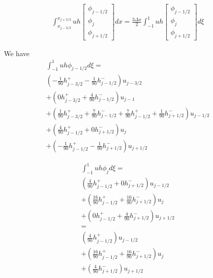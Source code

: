 \documentclass[12pt]{article}
\begin{document}
\begin{multline}
\int_{x_{j-3/2}}^{x_{j+3/2}} uh \left[\begin{array}{c}\phi_{j-1/2} \\\phi_{j}\\\phi_{j+1/2} \end{array}\right] dx = \frac{3 \Delta x}{2} \int_{-1}^{1} uh \left[\begin{array}{c}\phi_{j-1/2} \\\phi_{j}\\\phi_{j+1/2} \end{array}\right] d \xi
\end{multline}

We have
\begin{multline*}
\int_{-1}^{1} uh \phi_{j-1/2}d \xi = \\
\left(-\frac{1}{90}h^+ _{j - 3/2} - \frac{1}{90}h^- _{j - 1/2}  \right) u_{j - 3/2}\\
+ \left(0h^+ _{j - 3/2} + \frac{4}{90}h^- _{j - 1/2}  \right) u_{j - 1} \\
+ \left(\frac{1}{90}h^+ _{j - 3/2} + \frac{7}{90}h^- _{j - 1/2} + \frac{7}{90} h^+ _{j - 1/2} +   \frac{1}{90}h^- _{j + 1/2} \right) u_{j - 1/2} \\
+\left( \frac{4}{90} h^+ _{j - 1/2} + 0h^- _{j + 1/2}  \right) u_{j} \\ 
+\left( -\frac{1}{90}h^+ _{j - 1/2} -  \frac{1}{90}h^- _{j + 1/2} \right) u_{j + 1/2}
\end{multline*}


\begin{multline*}
\int_{-1}^{1} uh \phi_{j}d \xi = \\
\left( \frac{4}{90}h^+ _{j - 1/2} +  0h^- _{j + 1/2} \right) u_{j - 1/2} \\
+ \left(\frac{16}{90}h^+ _{j - 1/2} +  \frac{16}{90} h^- _{j + 1/2} \right) u_{j} \\
+ \left(0h^+ _{j - 1/2} +   \frac{4}{90}h^- _{j + 1/2} \right) u_{j + 1/2} \\= \\
\left( \frac{4}{90}h^+ _{j - 1/2} \right) u_{j - 1/2} \\
+ \left(\frac{16}{90}h^+ _{j - 1/2} +  \frac{16}{90} h^- _{j + 1/2} \right) u_{j} \\
+ \left( \frac{4}{90}h^- _{j + 1/2} \right) u_{j + 1/2} 
\end{multline*}
\end{document}

